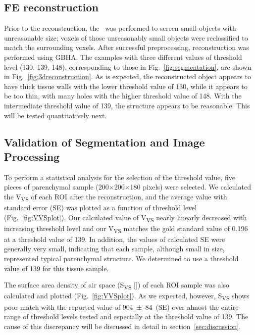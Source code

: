 \subsection{FE \threed reconstruction}
Prior to the \threed reconstruction, the \ was performed to screen small objects with unreasonable size; voxels of those unreasonably small objects were reclassified to match the surrounding voxels. After successful preprocessing, \threed reconstruction was performed using \ac{GBHA}. The examples with three different values of threshold level (130, 139, 148), corresponding to those in Fig.~\ref{fig:segmentation}, are shown in Fig.~\ref{fig:3dreconstruction}. As is expected, the \threed reconstructed object appears to have thick tissue walls with the lower threshold value of 130, while it appears to be too thin, with many holes with the higher threshold value of 148. With the intermediate threshold value of 139, the structure appears to be reasonable. This will be tested quantitatively next.

\subsection{Validation of Segmentation and Image Processing}
To perform a statistical analysis for the selection of the threshold value, five pieces of parenchymal sample (200$\times$200$\times$180 pixels) were selected. We calculated the V\textsubscript{VS} of each \ac{ROI} after the \threed reconstruction, and the average value with standard error (SE) was plotted as a function of threshold level (Fig.~\ref{fig:VVSplot}). Our calculated value of V\textsubscript{VS} nearly linearly decreased with increasing threshold level and our V\textsubscript{VS} matches the gold standard value of 0.196 at a threshold value of 139. In addition, the values of calculated SE were generally very small, indicating that each sample, although small in size, represented typical parenchymal structure. We determined to use a threshold value of 139 for this tissue sample.

The surface area density of air space (S\textsubscript{VS} [\centimetresquared\per\centimetrecubed]) of each \ac{ROI} sample was also calculated and plotted (Fig.~\ref{fig:VVSplot}). As we expected, however, S\textsubscript{VS} shows poor match with the reported value of \num[seperr]{904(84)}~(\acs{SE}) over almost the entire range of threshold levels tested and especially at the threshold value of 139. The cause of this discrepancy will be discussed in detail in section~\ref{sec:discussion}.

